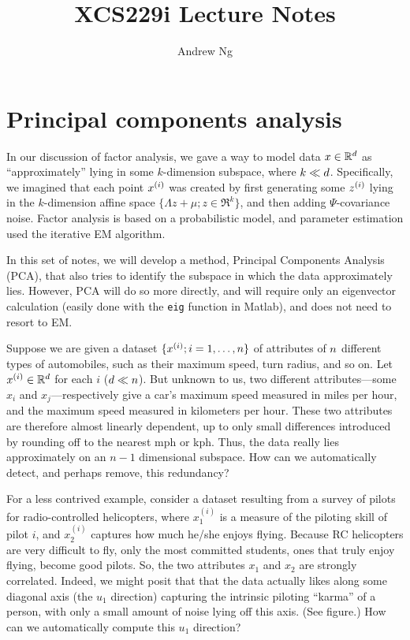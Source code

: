 \documentclass{article}
\begin{document}
\title{XCS229i Lecture Notes}
\author{Andrew Ng}
\date{}
\maketitle


\setcounter{part}{10}
\part{Principal components analysis}


In our discussion of factor analysis, we gave a way to model data $x \in {\mathbb R}^{d}$ as ``approximately'' lying in some $k$-dimension subspace, where $k \ll {d}$. Specifically, we imagined that each point ${x^{(i)}}$ was created by first generating some ${z^{(i)}}$ lying in the $k$-dimension affine space $\{\Lambda z+\mu; z \in \Re^k\}$, and then adding $\Psi$-covariance noise. Factor analysis is based on a probabilistic model, and parameter estimation used the iterative EM algorithm.

In this set of notes, we will develop a method, Principal Components Analysis (PCA), that also tries to identify the subspace in which the data approximately lies. However, PCA will do so more directly, and will require only an eigenvector calculation (easily done with the {\tt eig} function in Matlab), and does not need to resort to EM.

Suppose we are given a dataset $\{{x^{(i)}}; i=1, \ldots, {n}\}$ of attributes of ${n}$ different types of automobiles, such as their maximum speed, turn radius, and so on.
Let ${x^{(i)}} \in {\mathbb R}^{d}$ for each $i$ (${d} \ll {n}$). But unknown to us, two different attributes---some $x_i$ and $x_j$---respectively give a car's maximum speed measured in miles per hour, and the maximum speed measured in kilometers per hour. These two attributes are therefore almost linearly dependent, up to only small differences introduced by rounding off to the nearest mph or kph. Thus, the data really lies approximately on an $n-1$ dimensional subspace. How can we automatically detect, and perhaps remove,
this redundancy?

For a less contrived example, consider a dataset resulting from a survey of pilots for radio-controlled helicopters, where $x^{(i)}_1$ is a measure of the piloting skill of pilot $i$, and $x^{(i)}_2$ captures how much he/she enjoys flying. Because RC helicopters are very difficult to fly, only the most committed students, ones that truly enjoy flying, become good pilots. So, the two attributes $x_1$ and $x_2$ are strongly correlated. Indeed, we might posit that that the data actually likes along some diagonal axis (the $u_1$ direction) capturing the intrinsic piloting ``karma'' of a person, with only a small amount of noise lying off this axis. (See figure.) How can we automatically compute this $u_1$ direction?
\end{document}

